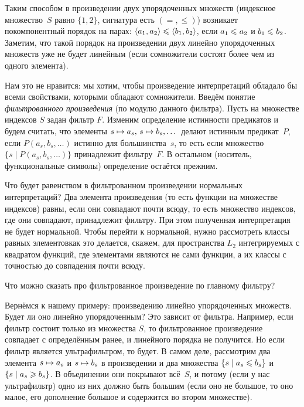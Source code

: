 Таким способом в произведении двух упорядоченных множеств (индексное
множество~$S$ равно $\{1,2\}$, сигнатура есть $({=},{\le})$)
возникает покомпонентный порядок на парах: $\langle
a_1,a_2\rangle\hm\le\langle b_1,b_2\rangle$, если $a_1\hm\le
a_2$ и $b_1\hm\le b_2$. Заметим, что такой порядок на
произведении двух линейно упорядоченных множеств уже не будет
линейным (если сомножители состоят более чем из одного
элемента).

Нам это не нравится: мы хотим, чтобы произведение интерпретаций
обладало бы всеми свойствами, которыми обладают сомножители.
Введём понятие \emph{фильтрованного произведения}%
(по модулю
данного фильтра). Пусть на множестве индексов $S$ задан фильтр
$F$. Изменим определение истинности предикатов и будем считать,
что элементы $s\hm\mapsto a_s,\,s\hm\mapsto b_s,\dots$ делают
истинным предикат~$P$, если $P(a_s,b_s,\dots)$ истинно  для
большинства~$s$, то есть если множество $\{s\mid
P(a_s,b_s,\dots)\}$ принадлежит фильтру~$F$. В остальном
(носитель, функциональные сим\-волы) определение остаётся прежним.

Что будет равенством в фильтрованном произведении нормальных
интерпретаций? Два элемента произведения (то есть функции на
множестве индексов) равны, если они  совпадают почти
всюду, то есть множество индексов, где они совпадают,
принадлежит фильтру. При этом полученная интерпретация не будет
нормальной. Чтобы перейти к нормальной, нужно рассмотреть классы
равных элементов\т как это делается, скажем, для пространства
$L_2$ интегрируемых с квадратом функций, где элементами являются
не сами функции, а их классы с точностью до совпадения почти
всюду.

\begin{problem}
Что можно сказать про фильтрованное произведение по главному
фильтру?
\end{problem}

Вернёмся к нашему примеру: произведению линейно упорядоченных
множеств. Будет ли оно линейно упорядоченным? Это зависит от
фильтра. Например, если фильтр состоит только из множества $S$,
то фильтрованное произведение совпадает с определённым ранее, и
линейного порядка не получится. Но если фильтр является
ультрафильтром, то будет. В самом деле, рассмотрим два элемента
$s\hm\mapsto a_s$ и $s\hm\mapsto b_s$ в произведении и два
множества $\{s\mid a_s\hm\le b_s\}$ и $\{s\mid a_s\hm\ge b_s\}$.
В объединении они покрывают всё~$S$, и потому (если у нас
ультрафильтр) одно из них должно быть большим (если оно не
большое, то оно малое, его дополнение большое и содержится во
втором множестве).

